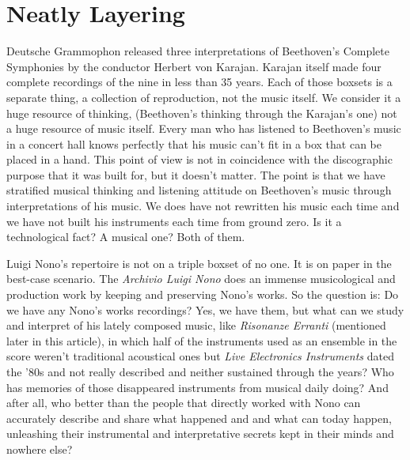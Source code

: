 \documentclass[twoside,a4paper]{article}
\begin{document}

\section{Neatly Layering}
\label{sec:layering}

Deutsche Grammophon released three interpretations of Beethoven's Complete Symphonies by the conductor Herbert von Karajan. Karajan itself made four complete recordings of the nine in less than 35 years\cite{rrrnyt}. Each of those boxsets is a separate thing, a collection of reproduction, not the music itself. We consider it a huge resource of thinking, (Beethoven's thinking through the Karajan's one) not a huge resource of music itself. Every man who has listened to Beethoven's music in a concert hall knows perfectly that his music can't fit in a box that can be placed in a hand. This point of view is not in coincidence with the discographic purpose that it was built for, but it doesn't matter. The point is that we have stratified musical thinking and listening attitude on Beethoven's music through interpretations of his music. We does have not rewritten his music each time and we have not built his instruments each time from ground zero. Is it a technological fact? A musical one? Both of them.

Luigi Nono's repertoire is not on a triple boxset of no one. It is on paper in the best-case scenario. The \emph{Archivio Luigi Nono} does an immense musicological and production work by keeping and preserving Nono's works. So the question is: Do we have any Nono's works recordings? Yes, we have them, but what can we study and interpret of his lately composed music, like \emph{Risonanze Erranti} (mentioned later in this article), in which half of the instruments used as an ensemble in the score weren't traditional acoustical ones but \emph{Live Electronics Instruments} dated the '80s and not really described and neither sustained through the years? Who has memories of those disappeared instruments from musical daily doing? And after all, who better than the people that directly worked with Nono can accurately describe and share what happened and and what can today happen, unleashing their instrumental and interpretative secrets kept in their minds and nowhere else?
\end{document}
